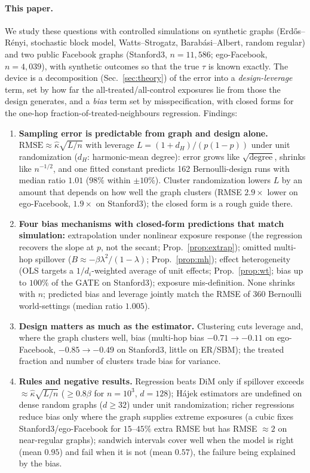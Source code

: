 \paragraph{This paper.} We study these questions with controlled simulations on synthetic graphs (Erd\H{o}s--R\'enyi, stochastic block model, Watts--Strogatz, Barab\'asi--Albert, random regular) and two public Facebook graphs (Stanford3, $n=11{,}586$; ego-Facebook, $n=4{,}039$), with synthetic outcomes so that the true $\tau$ is known exactly. The device is a decomposition (Sec.~\ref{sec:theory}) of the error into a \emph{design-leverage} term, set by how far the all-treated/all-control exposures lie from those the design generates, and a \emph{bias} term set by misspecification, with closed forms for the one-hop fraction-of-treated-neighbours regression. Findings:
\begin{enumerate}[leftmargin=*,itemsep=1pt,topsep=2pt]
\item \textbf{Sampling error is predictable from graph and design alone.} $\mathrm{RMSE}\approx\hat\kappa\sqrt{L/n}$ with leverage $L=(1+d_H)/(p(1-p))$ under unit randomization ($d_H$: harmonic-mean degree): error grows like $\sqrt{\text{degree}}$, shrinks like $n^{-1/2}$, and one fitted constant predicts 162 Bernoulli-design runs with median ratio $1.01$ ($98\%$ within $\pm10\%$). Cluster randomization lowers $L$ by an amount that depends on how well the graph clusters (RMSE $2.9\times$ lower on ego-Facebook, $1.9\times$ on Stanford3); the closed form is a rough guide there.
\item \textbf{Four bias mechanisms with closed-form predictions that match simulation:} extrapolation under nonlinear exposure response (the regression recovers the slope at $p$, not the secant; Prop.~\ref{prop:extrap}); omitted multi-hop spillover ($B\approx-\beta\lambda^2/(1-\lambda)$; Prop.~\ref{prop:mh}); effect heterogeneity (OLS targets a $1/d_i$-weighted average of unit effects; Prop.~\ref{prop:wt}; bias up to $100\%$ of the GATE on Stanford3); exposure mis-definition. None shrinks with $n$; predicted bias and leverage jointly match the RMSE of 360 Bernoulli world-settings (median ratio $1.005$).
\item \textbf{Design matters as much as the estimator.} Clustering cuts leverage and, where the graph clusters well, bias (multi-hop bias $-0.71\to-0.11$ on ego-Facebook, $-0.85\to-0.49$ on Stanford3, little on ER/SBM); the treated fraction and number of clusters trade bias for variance.
\item \textbf{Rules and negative results.} Regression beats DiM only if spillover exceeds $\approx\hat\kappa\sqrt{L/n}$ ($\ge0.8\beta$ for $n{=}10^3$, $d{=}128$); H\'ajek estimators are undefined on dense random graphs ($d\ge32$) under unit randomization; richer regressions reduce bias only where the graph supplies extreme exposures (a cubic fixes Stanford3/ego-Facebook for $15$--$45\%$ extra RMSE but has RMSE $\approx2$ on near-regular graphs); sandwich intervals cover well when the model is right (mean $0.95$) and fail when it is not (mean $0.57$), the failure being explained by the bias.
\end{enumerate}
